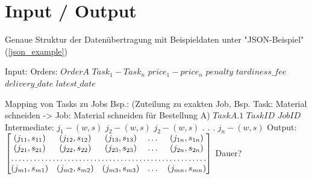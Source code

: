 \documentclass[a4paper,12pt,twoside]{scrreprt}
\begin{document}
\section*{Input / Output}
Genaue Struktur der Datenübertragung mit Beispieldaten unter "JSON-Beispiel"(\autoref{json_example})
\begin{flushleft}
	Input:\linebreak
	Orders:\linebreak
	$Order A$\linebreak
	$Task_1 - Task_n$\linebreak
	$price_1 - price_n$\linebreak
	$penalty$\linebreak
	$tardiness\_fee$\linebreak
	$delivery\_date$\linebreak
	$latest\_date$\linebreak
	
	Mapping von Tasks zu Jobs Bsp.:\linebreak
	(Zuteilung zu exakten Job, Bsp. Task: Material schneiden -> Job: Material schneiden für Bestellung A)\linebreak
	$Task A.1$\linebreak
	$Task ID$\linebreak
	$Job ID$ \linebreak\linebreak
	Intermediate:\linebreak
	$j_1 - (w, s)$\linebreak
	$j_2 - (w, s)$\linebreak
	$j_2 - (w, s)$\linebreak
	.\linebreak
	.\linebreak
	.\linebreak
	$j_n - (w, s)$\linebreak\linebreak
	Output:\linebreak
	$
	\begin{bmatrix}
		(j_{11}, s_{11}) & (j_{12}, s_{12}) & (j_{13}, s_{13}) & \dots & (j_{1n}, s_{1n})\\
		(j_{21}, s_{21}) & (j_{22}, s_{22}) & (j_{23}, s_{23}) & \dots & (j_{2n}, s_{2n})\\
		\hdotsfor{5} \\
		(j_{m1}, s_{m1}) & (j_{m2}, s_{m2}) & (j_{m3}, s_{m3}) & \dots & (j_{mn}, s_{mn})\\
	\end{bmatrix}
	$
	Dauer?
	

\end{flushleft}
\end{document}
